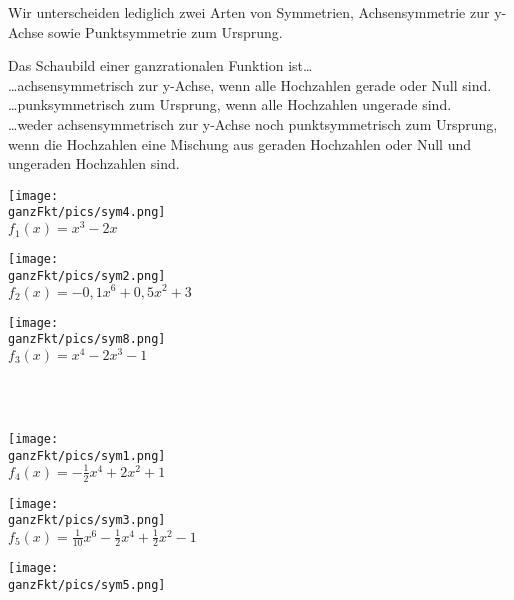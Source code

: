 Wir unterscheiden lediglich zwei Arten von Symmetrien, Achsensymmetrie zur y-Achse sowie Punktsymmetrie zum Ursprung.
\begin{tcolorbox}\centering
	\textcolor{loestc}{Das Schaubild einer ganzrationalen Funktion ist\dots\\
		\dots achsensymmetrisch zur y-Achse, wenn alle Hochzahlen gerade oder Null sind.\\
		\dots punksymmetrisch zum Ursprung, wenn alle Hochzahlen ungerade sind.\\
		\dots weder achsensymmetrisch zur y-Achse noch punktsymmetrisch zum Ursprung, wenn die Hochzahlen eine Mischung aus geraden Hochzahlen oder Null und ungeraden Hochzahlen sind.}
\end{tcolorbox}
\begin{minipage}{\textwidth}
	\begin{minipage}{0.32\textwidth}\centering
		\texttt{[image: \\ganzFkt/pics/sym4.png]}\\
		\(f_1(x)=x^3-2x\)
	\end{minipage}
	\begin{minipage}{0.32\textwidth}\centering
		\texttt{[image: \\ganzFkt/pics/sym2.png]}\\
		\(f_2(x)=-0,1x^6+0,5x^2+3\)
	\end{minipage}
	\begin{minipage}{0.32\textwidth}\centering
		\texttt{[image: \\ganzFkt/pics/sym8.png]}\\
		\(f_3(x)=x^4-2x^3-1\)
	\end{minipage}\\ \vspace{0.3cm}\\
	\begin{minipage}{0.32\textwidth}\centering
		\texttt{[image: \\ganzFkt/pics/sym1.png]}\\
		\(f_4(x)= -\frac{1}{2}x^4+2x^2+1\)
	\end{minipage}
	\begin{minipage}{0.32\textwidth}\centering
		\texttt{[image: \\ganzFkt/pics/sym3.png]}\\
		\(f_5(x)=\frac{1}{10}x^6-\frac{1}{2}x^4+\frac{1}{2}x^2-1\)
	\end{minipage}
	\begin{minipage}{0.32\textwidth}\centering
		\texttt{[image: \\ganzFkt/pics/sym5.png]}\\

\end{minipage}
\end{minipage}

